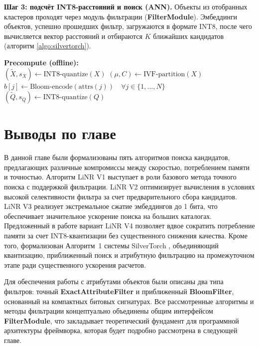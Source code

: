 \documentclass[14pt,a4paper]{extreport}
\numberwithin{figure}{chapter}
\numberwithin{table}{chapter}
\numberwithin{equation}{chapter}
\newcommand{\chapterconclusions}{
    \section{Выводы по главе}
}
\begin{document}
\textbf{Шаг 3: подсчёт INT8-расстояний и поиск (ANN).} Объекты из отобранных кластеров проходят через модуль фильтрации (\textbf{FilterModule}). Эмбеддинги объектов, успешно прошедших фильтр, загружаются в формате INT8, после чего вычисляется вектор расстояний и отбираются $K$ ближайших кандидатов (алгоритм \ref{algo:silvertorch}).

\begin{algorithm}[htbp]
\caption{SilverTorch, Алгоритм~1 (ANN с встроенной фильтрацией)}
\label{algo:silvertorch}
\textbf{Precompute (offline):}\\
$(\tilde{X}, s_X) \gets \text{INT8-quantize}(X)$\;
$(\mu, C) \gets \text{IVF-partition}(X)$\;
$b[j] \gets \text{Bloom-encode}(\text{attrs}(j)) \quad \forall j \in \{1,\dots,N\}$\;
$(\tilde{Q}, s_Q) \gets \text{INT8-quantize}(Q)$\;
\end{algorithm}

\chapterconclusions

В данной главе были формализованы пять алгоритмов поиска кандидатов, предлагающих различные компромиссы между скоростью, потреблением памяти и точностью. Алгоритм LiNR V1 выступает в роли базового метода точного поиска с поддержкой фильтрации. LiNR V2 оптимизирует вычисления в условиях высокой селективности фильтра за счет предварительного сбора кандидатов. LiNR V3 реализует экстремальное сжатие эмбеддингов до 1 бита, что обеспечивает значительное ускорение поиска на больших каталогах. Предложенный в работе вариант LiNR V4 позволяет вдвое сократить потребление памяти за счет INT8-квантизации без существенного снижения качества. Кроме того, формализован Алгоритм~1 системы SilverTorch \cite{xue2025silvertorch}, объединяющий квантизацию, приближенный поиск и атрибутную фильтрацию на промежуточном этапе ради существенного ускорения расчетов.

Для обеспечения работы с атрибутами объектов были описаны два типа фильтров: точный \textbf{ExactAttributeFilter} и приближенный \textbf{BloomFilter}, основанный на компактных битовых сигнатурах. Все рассмотренные алгоритмы и методы фильтрации концептуально объединены общим интерфейсом \textbf{FilterModule}, что закладывает теоретический фундамент для программной архитектуры фреймворка, которая будет подробно рассмотрена в следующей главе.
\end{document}
